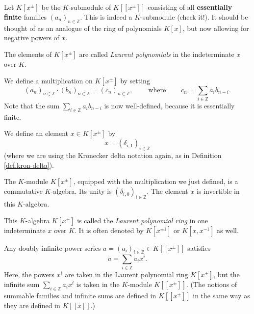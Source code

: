 \begin{definition}
\label{def.fps.laure.laupol}Let $K\left[  x^{\pm}\right]  $ be the
$K$-submodule of $K\left[  \left[  x^{\pm}\right]  \right]  $ consisting of
all \textbf{essentially finite} families $\left(  a_{n}\right)  _{n\in
\mathbb{Z}}$. This is indeed a $K$-submodule (check it!). It should be thought
of as an analogue of the ring of polynomials $K\left[  x\right]  $, but now
allowing for negative powers of $x$.

The elements of $K\left[  x^{\pm}\right]  $ are called \emph{Laurent
polynomials} in the indeterminate $x$ over $K$.

We define a multiplication on $K\left[  x^{\pm}\right]  $ by setting%
\[
\left(  a_{n}\right)  _{n\in\mathbb{Z}}\cdot\left(  b_{n}\right)
_{n\in\mathbb{Z}}=\left(  c_{n}\right)  _{n\in\mathbb{Z}}%
,\ \ \ \ \ \ \ \ \ \ \text{where}\ \ \ \ \ \ \ \ \ \ c_{n}=\sum_{i\in
\mathbb{Z}}a_{i}b_{n-i}.
\]
Note that the sum $\sum_{i\in\mathbb{Z}}a_{i}b_{n-i}$ is now well-defined,
because it is essentially finite.

We define an element $x\in K\left[  x^{\pm}\right]  $ by%
\[
x=\left(  \delta_{i,1}\right)  _{i\in\mathbb{Z}}%
\]
(where we are using the Kronecker delta notation again, as in Definition
\ref{def.kron-delta}).
\end{definition}

\begin{theorem}
\label{thm.fps.laure.laupol-ring}The $K$-module $K\left[  x^{\pm}\right]  $,
equipped with the multiplication we just defined, is a commutative
$K$-algebra. Its unity is $\left(  \delta_{i,0}\right)  _{i\in\mathbb{Z}}$.
The element $x$ is invertible in this $K$-algebra.
\end{theorem}

This $K$-algebra $K\left[  x^{\pm}\right]  $ is called the \emph{Laurent
polynomial ring} in one indeterminate $x$ over $K$. It is often denoted by
$K\left[  x^{\pm1}\right]  $ or $K\left[  x,x^{-1}\right]  $ as well.

\begin{proposition}
\label{prop.fps.laure.a=sumaixi}Any doubly infinite power series $a=\left(
a_{i}\right)  _{i\in\mathbb{Z}}\in K\left[  \left[  x^{\pm}\right]  \right]  $
satisfies%
\[
a=\sum_{i\in\mathbb{Z}}a_{i}x^{i}.
\]
Here, the powers $x^{i}$ are taken in the Laurent polynomial ring $K\left[
x^{\pm}\right]  $, but the infinite sum $\sum_{i\in\mathbb{Z}}a_{i}x^{i}$ is
taken in the $K$-module $K\left[  \left[  x^{\pm}\right]  \right]  $. (The
notions of summable families and infinite sums are defined in $K\left[
\left[  x^{\pm}\right]  \right]  $ in the same way as they are defined in
$K\left[  \left[  x\right]  \right]  $.)
\end{proposition}

